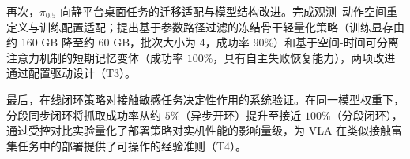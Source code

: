 再次，$\pi_{0.5}$ 向静平台桌面任务的迁移适配与模型结构改进。完成观测--动作空间重定义与训练配置适配；提出基于参数路径过滤的冻结骨干轻量化策略（训练显存由约 160 GB 降至约 60 GB，批次大小为 4，成功率 $90\%$）和基于空间-时间可分离注意力机制的短期记忆变体（成功率 $100\%$，具有自主失败恢复能力），两项改进通过配置驱动设计（T3）。

最后，在线闭环策略对接触敏感任务决定性作用的系统验证。在同一模型权重下，分段同步闭环将抓取成功率从约 $5\%$（异步开环）提升至接近 $100\%$（分段闭环），通过受控对比实验量化了部署策略对实机性能的影响量级，为 VLA 在类似接触富集任务中的部署提供了可操作的经验准则（T4）。
